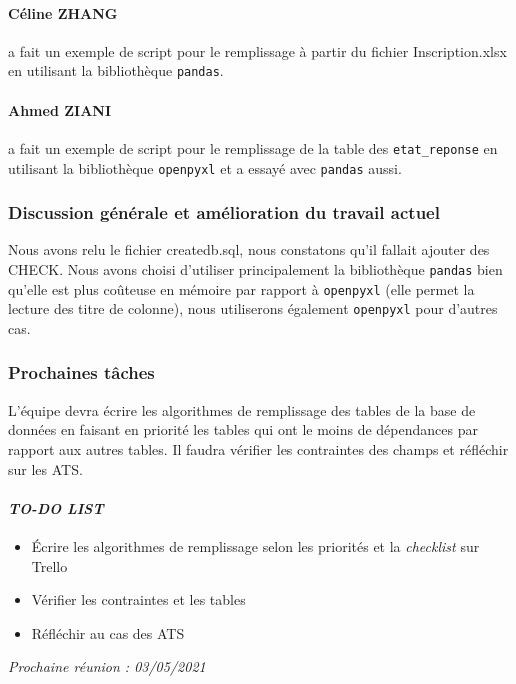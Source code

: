 \paragraph{Céline ZHANG} a fait un exemple de script pour le remplissage à partir du fichier \textsf{Inscription.xlsx} en utilisant la bibliothèque \texttt{pandas}.
\paragraph{Ahmed ZIANI} a fait un exemple de script pour le remplissage de la table des \texttt{etat\_reponse} en utilisant la bibliothèque \texttt{openpyxl} et a essayé avec \texttt{pandas} aussi.

\subsubsection*{Discussion générale et amélioration du travail actuel}
Nous avons relu le fichier \textsf{createdb.sql}, nous constatons qu'il fallait ajouter des \textsf{CHECK}. Nous avons choisi d'utiliser principalement la bibliothèque \texttt{pandas} bien qu'elle est plus coûteuse en mémoire par rapport à \texttt{openpyxl} (elle permet la lecture des titre de colonne), nous utiliserons également \texttt{openpyxl} pour d'autres cas.

\subsubsection*{Prochaines tâches}
L'équipe devra écrire les algorithmes de remplissage des tables de la base de données en faisant en priorité les tables qui ont le moins de dépendances par rapport aux autres tables. Il faudra vérifier les contraintes des champs et réfléchir sur les ATS.


\paragraph{\emph{TO-DO LIST}}
\begin{itemize}
    \item Écrire les algorithmes de remplissage selon les priorités et la \textsl{checklist} sur Trello
    \item Vérifier les contraintes et les tables
    \item Réfléchir au cas des ATS
    
\end{itemize}

\emph{Prochaine réunion : 03/05/2021}\\

% 